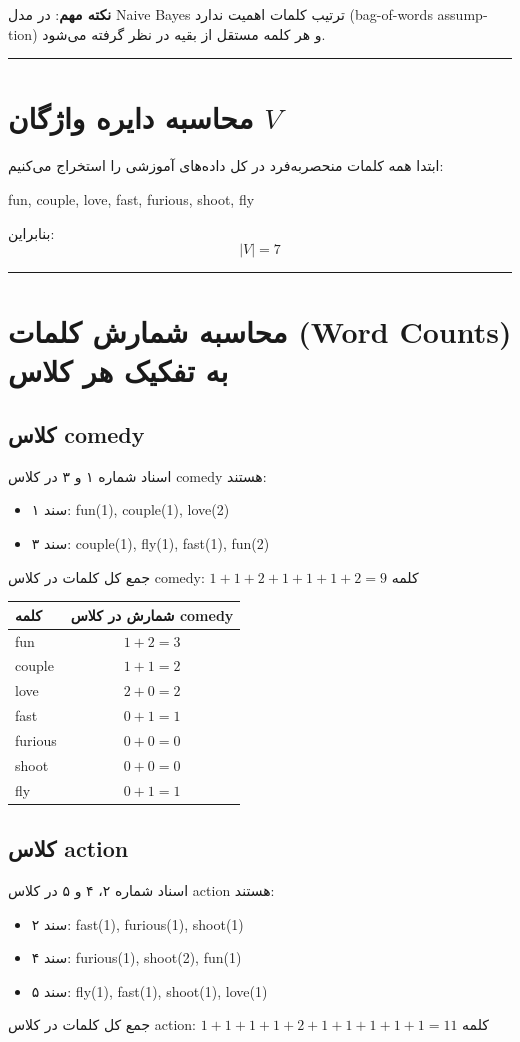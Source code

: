 \documentclass[11pt,a4paper]{article}
\newcommand{\en}[1]{\textenglish{#1}}
\newcommand{\separator}{\vspace{1em}\noindent\rule{\linewidth}{0.4pt}\vspace{1em}}
\begin{document}
\textbf{نکته مهم}: در مدل \en{Naive Bayes} ترتیب کلمات اهمیت ندارد (\en{bag-of-words assumption}) و هر کلمه مستقل از بقیه در نظر گرفته می‌شود.

\separator
\section{محاسبه دایره واژگان $V$}
ابتدا همه کلمات منحصربه‌فرد در کل داده‌های آموزشی را استخراج می‌کنیم:

\begin{center}
\en{fun, couple, love, fast, furious, shoot, fly}
\end{center}

بنابراین:
\[
|V| = 7
\]

\separator
\section{محاسبه شمارش کلمات (\en{Word Counts}) به تفکیک هر کلاس}

\subsection*{کلاس \en{comedy}}
اسناد شماره ۱ و ۳ در کلاس \en{comedy} هستند:
\begin{itemize}
\item سند ۱: \en{fun(1), couple(1), love(2)}
\item سند ۳: \en{couple(1), fly(1), fast(1), fun(2)}
\end{itemize}
جمع کل کلمات در کلاس \en{comedy}: $1+1+2+1+1+1+2 = 9$ کلمه

\begin{center}
\begin{tabular}{|l|c|}
\hline
\textbf{کلمه} & \textbf{شمارش در کلاس \en{comedy}} \\
\hline
\en{fun} & $1 + 2 = 3$ \\
\hline
\en{couple} & $1 + 1 = 2$ \\
\hline
\en{love} & $2 + 0 = 2$ \\
\hline
\en{fast} & $0 + 1 = 1$ \\
\hline
\en{furious} & $0 + 0 = 0$ \\
\hline
\en{shoot} & $0 + 0 = 0$ \\
\hline
\en{fly} & $0 + 1 = 1$ \\
\hline
\end{tabular}
\end{center}

\subsection*{کلاس \en{action}}
اسناد شماره ۲، ۴ و ۵ در کلاس \en{action} هستند:
\begin{itemize}
\item سند ۲: \en{fast(1), furious(1), shoot(1)}
\item سند ۴: \en{furious(1), shoot(2), fun(1)}
\item سند ۵: \en{fly(1), fast(1), shoot(1), love(1)}
\end{itemize}
جمع کل کلمات در کلاس \en{action}: $1+1+1+1+2+1+1+1+1+1 = 11$ کلمه
\end{document}

